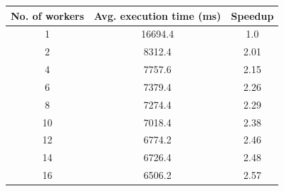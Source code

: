 \begin{center}
    \begin{tabular}{c | c | c}
        \textbf{No. of workers} & \textbf{Avg. execution time (ms)} & \textbf{Speedup}\\\hline\hline
         \color{BrickRed}1 & \color{BrickRed}\num{16694.4} & \color{BrickRed}\num{1.0}\\
         2 & \num{8312.4} & \num{2.01}\\
         4 & \num{7757.6} & \num{2.15}\\
         6 & \num{7379.4} & \num{2.26}\\
         8 & \num{7274.4} & \num{2.29}\\
         10 & \num{7018.4} & \num{2.38}\\
         12 & \num{6774.2} & \num{2.46}\\
         14 & \num{6726.4} & \num{2.48}\\
         \color{OliveGreen}16 & \color{OliveGreen}\num{6506.2} & \color{OliveGreen}\num{2.57}
    \end{tabular}
\end{center}










